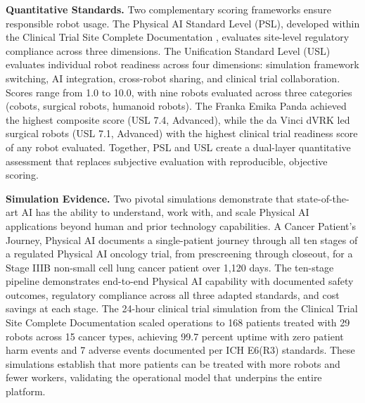 \vspace{0.3cm}

\noindent\textbf{Quantitative Standards.}
Two complementary scoring frameworks ensure responsible robot usage. The
Physical AI Standard Level (PSL), developed within the Clinical Trial Site
Complete Documentation \cite{site-docs}, evaluates site-level regulatory
compliance across three dimensions. The Unification Standard Level (USL)
\cite{usl-standard} evaluates individual robot readiness across four dimensions:
simulation framework switching, AI integration, cross-robot sharing, and
clinical trial collaboration. Scores range from 1.0 to 10.0, with nine robots
evaluated across three categories (cobots, surgical robots, humanoid robots).
The Franka Emika Panda achieved the highest composite score (USL 7.4,
Advanced), while the da Vinci dVRK led surgical robots (USL 7.1, Advanced) with
the highest clinical trial readiness score of any robot evaluated. Together, PSL
and USL create a dual-layer quantitative assessment that replaces subjective
evaluation with reproducible, objective scoring.

\vspace{0.3cm}

\noindent\textbf{Simulation Evidence.}
Two pivotal simulations demonstrate that state-of-the-art AI has the ability to
understand, work with, and scale Physical AI applications beyond human and prior
technology capabilities. A Cancer Patient's Journey, Physical AI
\cite{patient-journey-paper} documents a single-patient journey through all ten
stages of a regulated Physical AI oncology trial, from prescreening through
closeout, for a Stage IIIB non-small cell lung cancer patient over 1,120 days.
The ten-stage pipeline demonstrates end-to-end Physical AI capability with
documented safety outcomes, regulatory compliance across all three adapted
standards, and cost savings at each stage. The 24-hour clinical trial simulation
from the Clinical Trial Site Complete Documentation \cite{site-docs} scaled
operations to 168 patients treated with 29 robots across 15 cancer types,
achieving 99.7 percent uptime with zero patient harm events and 7 adverse events
documented per ICH E6(R3) standards. These simulations establish that more
patients can be treated with more robots and fewer workers, validating the
operational model that underpins the entire platform.

\vspace{0.3cm}

